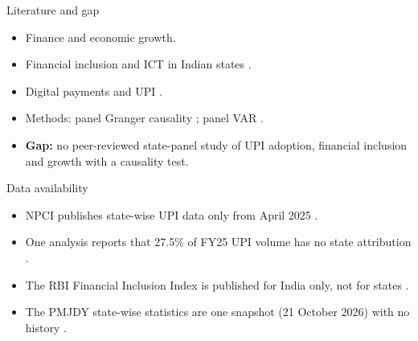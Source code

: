 \documentclass[aspectratio=169,11pt]{beamer}
\begin{document}
\begin{frame}{Literature and gap}
\begin{itemize}
\item Finance and economic growth.
\item Financial inclusion and ICT in Indian states \citep{pradhan2021tfsc,pradhan2021ael}.
\item Digital payments and UPI \citep{reddy2024icrier}.
\item Methods: panel Granger causality \citep{dumitrescu2012}; panel VAR \citep{love2006,abrigo2016}.
\item \textbf{Gap:} no peer-reviewed state-panel study of UPI adoption, financial inclusion and growth with a causality test.
\end{itemize}
\end{frame}

\begin{frame}{Data availability}
\begin{itemize}
\item NPCI publishes state-wise UPI data only from April 2025 \citep{npci_upi_state,medianama2025npci}. %
\item One analysis reports that 27.5\% of FY25 UPI volume has no state attribution \citep{dataful2026upi}. %
\item The RBI Financial Inclusion Index is published for India only, not for states \citep{rbi_fiindex2025}. %
\item The PMJDY state-wise statistics are one snapshot (21 October 2026) with no history \citep{pmjdy_statewise}. %
\end{itemize}
\end{frame}
\end{document}

